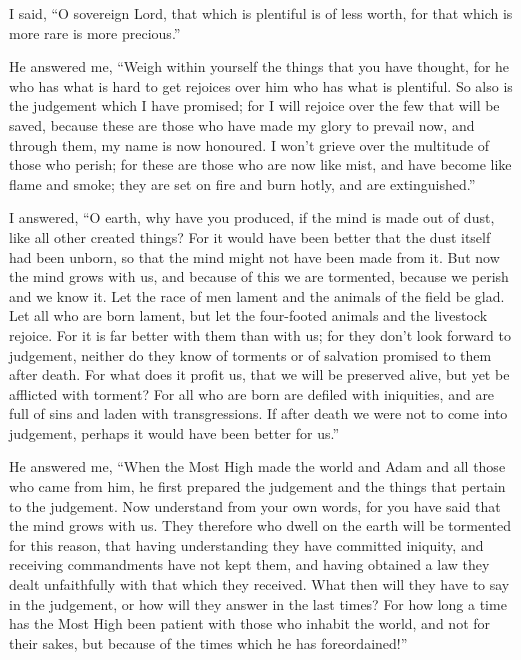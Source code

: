  I said, ``O sovereign Lord, that which is plentiful is of
less worth, for that which is more rare is more precious.''

 He answered me, ``Weigh within yourself the things that
you have thought, for he who has what is hard to get rejoices over him
who has what is plentiful.  So also is the judgement which
I have promised; for I will rejoice over the few that will be saved,
because these are those who have made my glory to prevail now, and
through them, my name is now honoured.  I won't grieve over
the multitude of those who perish; for these are those who are now like
mist, and have become like flame and smoke; they are set on fire and
burn hotly, and are extinguished.''

 I answered, ``O earth, why have you produced, if the mind
is made out of dust, like all other created things?  For it
would have been better that the dust itself had been unborn, so that the
mind might not have been made from it.  But now the mind
grows with us, and because of this we are tormented, because we perish
and we know it.  Let the race of men lament and the animals
of the field be glad. Let all who are born lament, but let the
four-footed animals and the livestock rejoice.  For it is
far better with them than with us; for they don't look forward to
judgement, neither do they know of torments or of salvation promised to
them after death.  For what does it profit us, that we will
be preserved alive, but yet be afflicted with torment?  For
all who are born are defiled with iniquities, and are full of sins and
laden with transgressions.  If after death we were not to
come into judgement, perhaps it would have been better for us.''

 He answered me, ``When the Most High made the world and
Adam and all those who came from him, he first prepared the judgement
and the things that pertain to the judgement.  Now
understand from your own words, for you have said that the mind grows
with us.  They therefore who dwell on the earth will be
tormented for this reason, that having understanding they have committed
iniquity, and receiving commandments have not kept them, and having
obtained a law they dealt unfaithfully with that which they received.
 What then will they have to say in the judgement, or how
will they answer in the last times?  For how long a time
has the Most High been patient with those who inhabit the world, and not
for their sakes, but because of the times which he has foreordained!''

